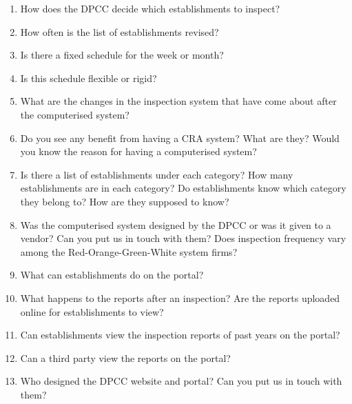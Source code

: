 \documentclass[a4paper, 12pt]{article}
\begin{document}
\begin{mdframed}[backgroundcolor=gray!20]
\begin{enumerate}
		\item{How does the DPCC decide which establishments to inspect?}
		\item{How often is the list of establishments revised?}
		\item{Is there a fixed schedule for the week or month?}
		\item{Is this schedule flexible or rigid?}
		\item{What are the changes in the inspection system that have come about after the computerised system?}
		\item{Do you see any benefit from having a CRA system? What are they? Would you know the reason for having a computerised system?}
		\item{Is there a list of establishments under each category? How many establishments are in each category? Do establishments know which category they belong to? How are they supposed to know?}
		\item{Was the computerised system designed by the DPCC or was it given to a vendor? Can you put us in touch with them? Does inspection frequency vary among the Red-Orange-Green-White system firms?}
		\item{What can establishments do on the portal?}
		\item{What happens to the reports after an inspection? Are the reports uploaded online for establishments to view?}
		\item{Can establishments view the inspection reports of past years on the portal?}
		\item{Can a third party view the reports on the portal?}
		\item{Who designed the DPCC website and portal? Can you put us in touch with them?}
		\end{enumerate}
		\end{mdframed}
\end{document}
